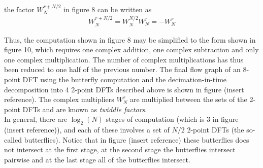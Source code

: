 the factor $W_N^{r+N/2}$ in figure 8 can be written as
\begin{align*}
W_N^{r+N/2} = W_N^{N/2} W_N^r = -W_N^r
\end{align*}

Thus, the computation shown in figure 8 may be simplified to the form shown in figure 10, which requires one complex addition, one complex subtraction and only one complex multiplication. The number of complex multiplications has thus been reduced to one half of the previous number. The final flow graph of an 8-point DFT using the butterfly computation and the decimation-in-time decomposition into 4 2-point DFTs described above is shown in figure (insert reference). The complex multipliers $W_N^r$ are multiplied between the sets of the 2-point DFTs and are known as \textit{twiddle factors}.
\\
In general, there are $\log_2(N)$ stages of computation (which is 3 in figure (insert reference)), and each of these involves a set of $N/2$ 2-point DFTs (the so-called butterflies). Notice that in figure (insert reference) these butterflies does not intersect at the first stage, at the second stage the butterflies intersect pairwise and at the last stage all of the butterflies intersect. 